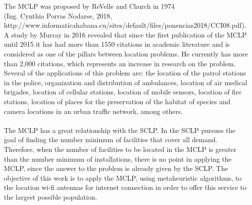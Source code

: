 \documentclass[12pt,a4paper,twoside]{article}
\begin{document}
The MCLP was proposed by ReVelle and Church in 1974 \\(Ing. Cynthia Porras Nodarse, 2018, \\http://www.informaticahabana.cu/sites/default/files/ponencias2018/CCI08.pdf).\\ A study by Murray in 2016 revealed that since the first publication of the MCLP until 2015 it has had more than 1550 citations in academic literature and is considered as one of the pillars between location problems. He currently has more than 2,000 citations, which represents an increase in research on the problem. Several of the applications of this problem are: the location of the patrol stations in the police, organization and distribution of ambulances, location of air medical brigades, location of cellular stations, location of mobile sensors, location of fire stations, location of places for the preservation of the habitat of species and camera locations in an urban traffic network, among others.\\\\
The MCLP has a great relationship with the SCLP. In the SCLP pursues the goal of finding the number minimum of facilities that cover all demand. Therefore, when the number of facilities to be located in the MCLP is greater than the number minimum of installations, there is no point in applying the MCLP, since the answer to the problem is already given by the SCLP. The objective of this work is to apply the MCLP, using metaheuristic algorithms, to the location wi-fi antennas for internet connection in order to offer this service to the largest possible population.
\end{document}
